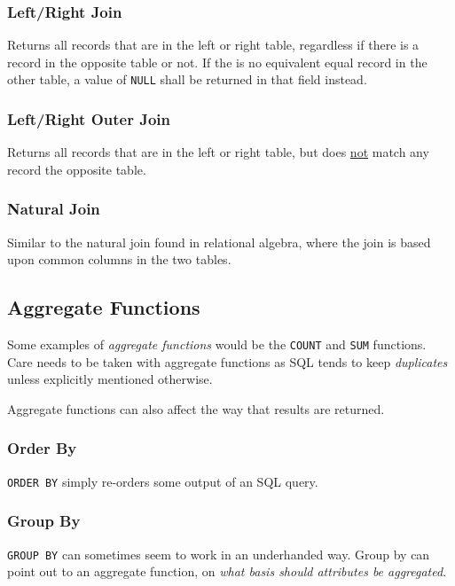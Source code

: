 \documentclass{article}
\begin{document}
\subsubsection{Left/Right Join}

Returns all records that are in the left or right table, regardless if there is a record in the opposite table or not. If the is no equivalent equal record in the other table, a value of \texttt{NULL} shall be returned in that field instead.

\subsubsection{Left/Right Outer Join}

Returns all records that are in the left or right table, but does \underline{not} match any record the opposite table.

\subsubsection{Natural Join}

Similar to the natural join found in relational algebra, where the join is based upon common columns in the two tables.

\filbreak
\subsection{Aggregate Functions}

Some examples of \textit{aggregate functions} would be the \texttt{COUNT} and \texttt{SUM} functions. Care needs to be taken with aggregate functions as SQL tends to keep \textit{duplicates} unless explicitly mentioned otherwise. 

Aggregate functions can also affect the way that results are returned.

\subsubsection{Order By}

\texttt{ORDER BY} simply re-orders some output of an SQL query. 

\subsubsection{Group By}

\texttt{GROUP BY} can sometimes seem to work in an underhanded way. Group by can point out to an aggregate function, on \textit{what basis should attributes be aggregated}.
\end{document}
